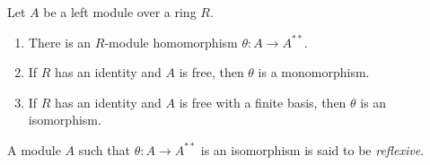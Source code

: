 Let $A$ be a left module over a ring $R$.
\begin{enumerate}
\item[(i)] There is an $R$-module homomorphism $\theta : A \to A^{**}$.
\item[(ii)] If $R$ has an identity and $A$ is free, then $\theta$ is a monomorphism.
\item[(iii)] If $R$ has an identity and $A$ is free with a finite basis, then $\theta$ is an isomorphism.
\end{enumerate}
A module $A$ such that $\theta : A \to A^{**}$ is an isomorphism is said to be \emph{reflexive}.
